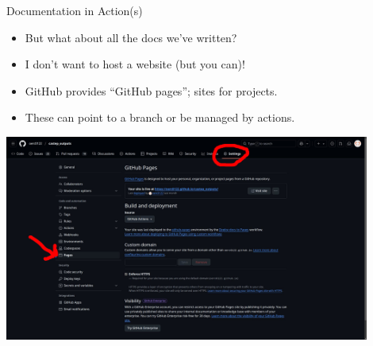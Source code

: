 \documentclass[usenames,dvipsnames]{beamer}
\begin{document}
\begin{frame}{Documentation in Action(s)}
    \begin{itemize}[<+->]
        \item{}But what about all the docs we've written?
        \item{}I don't want to host a website (but you can)!
        \item{}GitHub provides ``GitHub pages''; sites for projects.
        \item{}These can point to a branch or be managed by actions.
    \end{itemize}

     {
        \begin{center}
            \includegraphics[width=0.9\textwidth]{ghpages.jpg}
        \end{center}
    }
\end{frame}
\end{document}
